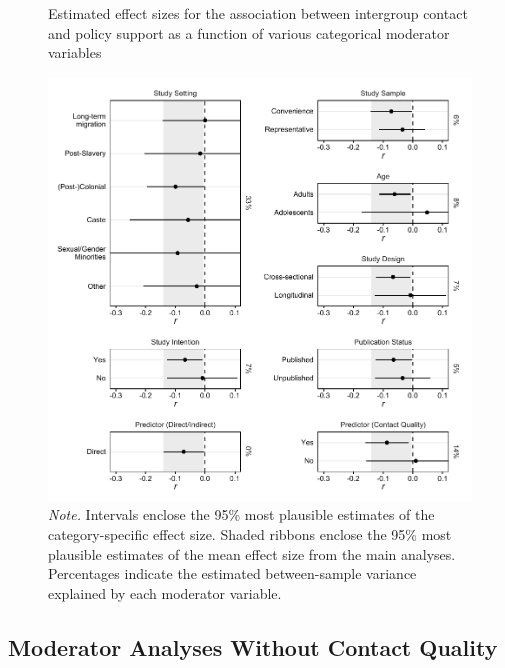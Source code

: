 \documentclass[12pt, letterpaper]{article}
\begin{document}
\begin{figure}
\centering
\caption{Estimated effect sizes for the association between intergroup contact and policy support as a function of various categorical moderator variables}
\includegraphics[scale=1]{../figures/figure-s2}
\caption*{\textit{Note.} Intervals enclose the 95\% most plausible estimates of the category-specific effect size. Shaded ribbons enclose the 95\% most plausible estimates of the mean effect size from the main analyses. Percentages indicate the estimated between-sample variance explained by each moderator variable.}
\label{fig:s2}
\end{figure}

\hypertarget{moderator-analyses-without-contact-quality}{%
\subsection{Moderator Analyses Without Contact
Quality}\label{moderator-analyses-without-contact-quality}}
\end{document}
